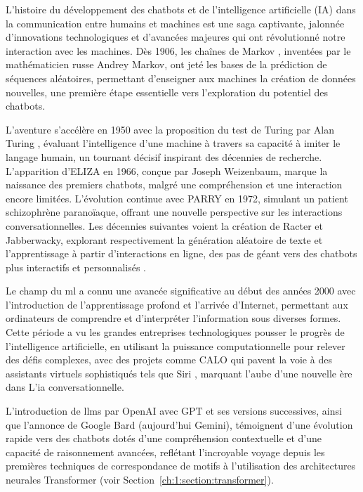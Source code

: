 L'histoire du développement des chatbots et de l'intelligence artificielle (IA) dans la communication entre humains et machines est une saga captivante, jalonnée d'innovations technologiques et d'avancées majeures qui ont révolutionné notre interaction avec les machines. Dès 1906, les chaînes de Markov \cite{Green1996MarkovCM}, inventées par le mathématicien russe Andrey Markov, ont jeté les bases de la prédiction de séquences aléatoires, permettant d'enseigner aux machines la création de données nouvelles, une première étape essentielle vers l'exploration du potentiel des chatbots.

L'aventure s'accélère en 1950 avec la proposition du test de Turing par Alan Turing \cite{turingTest}, évaluant l'intelligence d'une machine à travers sa capacité à imiter le langage humain, un tournant décisif inspirant des décennies de recherche. L'apparition d'ELIZA \cite{eliza1966} en 1966, conçue par Joseph Weizenbaum, marque la naissance des premiers chatbots, malgré une compréhension et une interaction encore limitées. L'évolution continue avec PARRY en 1972, simulant un patient schizophrène paranoïaque, offrant une nouvelle perspective sur les interactions conversationnelles. Les décennies suivantes voient la création de Racter et Jabberwacky, explorant respectivement la génération aléatoire de texte et l'apprentissage à partir d'interactions en ligne, des pas de géant vers des chatbots plus interactifs et personnalisés \cite{chatbotHistoryChatbots, Weizenbaum1966ELIZAaCP, alamin2024history}. 

Le champ du \ac{ml} a connu une avancée significative au début des années 2000 avec l'introduction de l'apprentissage profond et l'arrivée d'Internet, permettant aux ordinateurs de comprendre et d'interpréter l'information sous diverses formes. Cette période a vu les grandes entreprises technologiques pousser le progrès de l'intelligence artificielle, en utilisant la puissance computationnelle pour relever des défis complexes, avec des projets comme CALO qui pavent la voie à des assistants virtuels sophistiqués tels que Siri \cite{siri}, marquant l'aube d'une nouvelle ère dans L'\ac{ia} conversationnelle.

L'introduction de \acfp{llm} par OpenAI avec GPT et ses versions successives, ainsi que l'annonce de Google Bard (aujourd'hui Gemini), témoignent d'une évolution rapide vers des chatbots dotés d'une compréhension contextuelle et d'une capacité de raisonnement avancées, reflétant l'incroyable voyage depuis les premières techniques de correspondance de motifs à l'utilisation des architectures neurales Transformer (voir Section~\ref{ch:1:section:transformer}).

